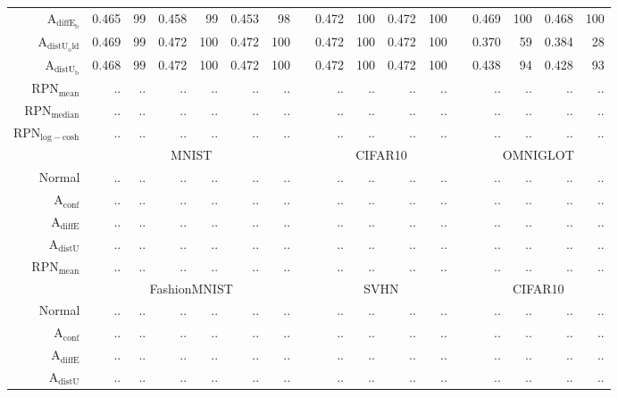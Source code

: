 \begin{table}[ht]
\begin{tiny}
\begin{tabular}{@{}rrrrrrrcrrrrcrrrr@{}}
			$\mathrm{A}_{\mathrm{diffE_b}}$ & 0.465 & 99 & 0.458 & 99 & 0.453 & 98 & & 0.472 & 100 & 0.472 & 100 & & 0.469 & 100 & 0.468 & 100 \\
			$\mathrm{A}_{\mathrm{distU_old}}$ & 0.469 & 99 & 0.472 & 100 & 0.472 & 100 & & 0.472 & 100 & 0.472 & 100 & & 0.370 & 59 & 0.384 & 28 \\
			$\mathrm{A}_{\mathrm{distU_b}}$ & 0.468 & 99 & 0.472 & 100 & 0.472 & 100 & & 0.472 & 100 & 0.472 & 100 & & 0.438 & 94 & 0.428 & 93 \\
			$\mathrm{RPN}_{\mathrm{mean}}$ & .. & .. & .. & .. & .. & .. & & .. & .. & .. & .. & & .. & .. & .. & .. \\
			$\mathrm{RPN}_{\mathrm{median}}$ & .. & .. & .. & .. & .. & .. & & .. & .. & .. & .. & & .. & .. & .. & .. \\
			$\mathrm{RPN}_{\mathrm{log-cosh}}$ & .. & .. & .. & .. & .. & .. & & .. & .. & .. & .. & & .. & .. & .. & .. \\
			\midrule
			& \multicolumn{6}{c}{MNIST}   & & \multicolumn{4}{c}{CIFAR10} & & \multicolumn{4}{c}{OMNIGLOT} \\
			Normal                         & .. & .. & .. & .. & .. & .. & & .. & .. & .. & .. & & .. & .. & .. & .. \\
			$\mathrm{A}_{\mathrm{conf}}$  & .. & .. & .. & .. & .. & .. & & .. & .. & .. & .. & & .. & .. & .. & .. \\
			$\mathrm{A}_{\mathrm{diffE}}$ & .. & .. & .. & .. & .. & .. & & .. & .. & .. & .. & & .. & .. & .. & .. \\
			$\mathrm{A}_{\mathrm{distU}}$ & .. & .. & .. & .. & .. & .. & & .. & .. & .. & .. & & .. & .. & .. & .. \\
			$\mathrm{RPN}_{\mathrm{mean}}$ & .. & .. & .. & .. & .. & .. & & .. & .. & .. & .. & & .. & .. & .. & .. \\
			\midrule
			& \multicolumn{6}{c}{FashionMNIST} & & \multicolumn{4}{c}{SVHN} & & \multicolumn{4}{c}{CIFAR10} \\
			Normal                         & .. & .. & .. & .. & .. & .. & & .. & .. & .. & .. & & .. & .. & .. & .. \\
			$\mathrm{A}_{\mathrm{conf}}$  & .. & .. & .. & .. & .. & .. & & .. & .. & .. & .. & & .. & .. & .. & .. \\
			$\mathrm{A}_{\mathrm{diffE}}$ & .. & .. & .. & .. & .. & .. & & .. & .. & .. & .. & & .. & .. & .. & .. \\
			$\mathrm{A}_{\mathrm{distU}}$ & .. & .. & .. & .. & .. & .. & & .. & .. & .. & .. & & .. & .. & .. & .. \\

\end{tabular}
\end{tiny}
\end{table}
